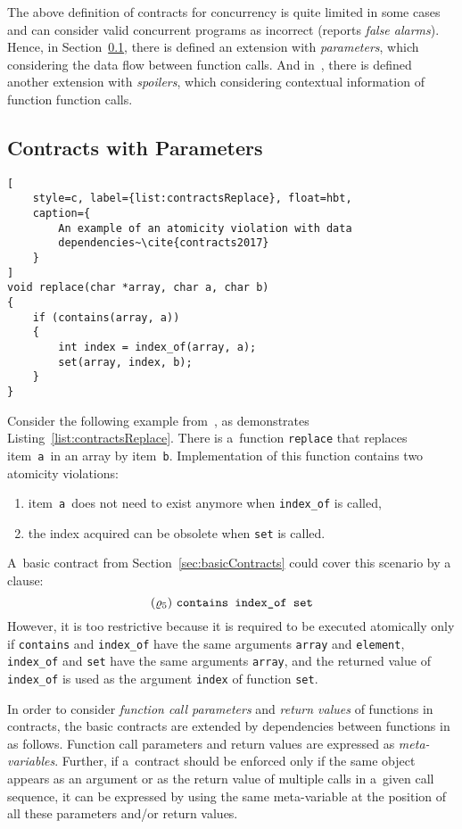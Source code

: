 The above definition of contracts for concurrency is quite limited in
some cases and can consider valid concurrent programs as incorrect (reports
\emph{false alarms}). Hence, in Section~\ref{sec:parameterContracts},
there is defined an extension with \emph{parameters}, which considering the
data flow between function calls. And in~\cite{contracts2017}, there
is defined another extension with \emph{spoilers}, which considering
contextual information of function function calls.


\subsection{Contracts with Parameters}
\label{sec:parameterContracts}

\begin{lstlisting}[
    style=c, label={list:contractsReplace}, float=hbt,
    caption={
        An example of an atomicity violation with data
        dependencies~\cite{contracts2017}
    }
]
void replace(char *array, char a, char b)
{
    if (contains(array, a))
    {
        int index = index_of(array, a);
        set(array, index, b);
    }
}
\end{lstlisting}

Consider the following example from~\cite{contracts2017}, as demonstrates
Listing~\ref{list:contractsReplace}. There is a~function \texttt{replace}
that replaces item~\texttt{a}~in an array by item~\texttt{b}. Implementation
of this function contains two atomicity violations:
\begin{enumerate}[label={(\roman*)}]
    \item
        item~\texttt{a}~does not need to exist anymore when \texttt{index\_of}
        is called,

    \item
        the index acquired can be obsolete when \texttt{set} is called.
\end{enumerate}
A~basic contract from Section~\ref{sec:basicContracts} could cover
this scenario by a clause:
$$ (\varrho_5)\ \text{\texttt{contains index\_of set}} $$
However, it is too restrictive because it is required to be executed
atomically only if \texttt{contains} and \texttt{index\_of} have the same
arguments \texttt{array} and \texttt{element}, \texttt{index\_of} and
\texttt{set} have the same arguments \texttt{array}, and the returned value of
\texttt{index\_of} is used as the argument \texttt{index} of function
\texttt{set}.

In order to consider \emph{function call parameters} and \emph{return values}
of functions in contracts, the basic contracts are extended by dependencies
between functions in~\cite{contracts2017} as follows. Function call parameters
and return values are expressed as \emph{meta-variables}. Further, if a~contract
should be enforced only if the same object appears as an argument or as
the return value of multiple calls in a~given call sequence, it can be expressed
by using the same meta-variable at the position of all these parameters
and/or return values.

